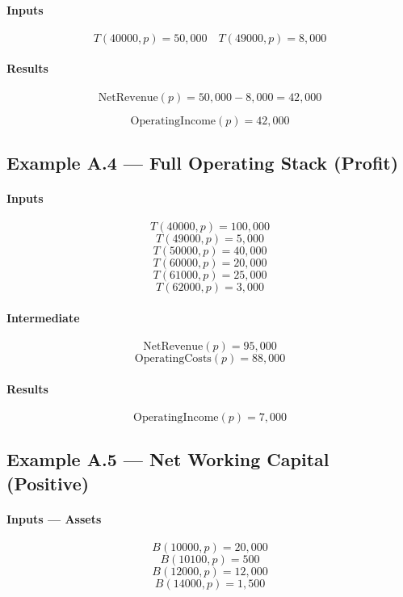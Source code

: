 \documentclass[11pt]{article}
\newcommand{\Balance}{B}
\newcommand{\Total}{T}
\newcommand{\Period}{p}
\begin{document}
\paragraph{Inputs}
\[
\Total(40000,\Period) = 50{,}000
\quad
\Total(49000,\Period) = 8{,}000
\]

\paragraph{Results}
\[
\text{NetRevenue}(\Period)
=
50{,}000 - 8{,}000
=
42{,}000
\]

\[
\text{OperatingIncome}(\Period) = 42{,}000
\]

\subsection{Example A.4 — Full Operating Stack (Profit)}

\paragraph{Inputs}
\[
\Total(40000,\Period) = 100{,}000
\]
\[
\Total(49000,\Period) = 5{,}000
\]
\[
\Total(50000,\Period) = 40{,}000
\]
\[
\Total(60000,\Period) = 20{,}000
\]
\[
\Total(61000,\Period) = 25{,}000
\]
\[
\Total(62000,\Period) = 3{,}000
\]

\paragraph{Intermediate}
\[
\text{NetRevenue}(\Period) = 95{,}000
\]
\[
\text{OperatingCosts}(\Period) = 88{,}000
\]

\paragraph{Results}
\[
\text{OperatingIncome}(\Period) = 7{,}000
\]

\subsection{Example A.5 — Net Working Capital (Positive)}

\paragraph{Inputs — Assets}
\[
\Balance(10000,\Period) = 20{,}000
\]
\[
\Balance(10100,\Period) = 500
\]
\[
\Balance(12000,\Period) = 12{,}000
\]
\[
\Balance(14000,\Period) = 1{,}500
\]
\end{document}
